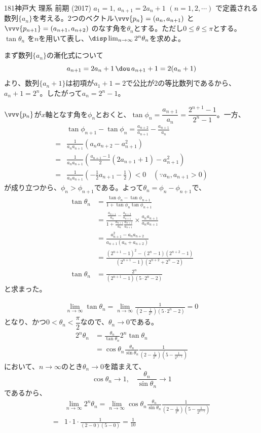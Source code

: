 \begin{prob}{181}{}{神戸大 理系 前期 (2017)}
 $a_1=1$, $a_{n+1}=2a_n+1$ $(n=1, 2, \cdots)$ で定義される数列$\{a_n\}$を考える。2つのベクトル$\vvv{p_n}=(a_n, a_{n+1})$ と$\vvv{p_{n+1}}=(a_{n+1},a_{n+2})$ のなす角を$\theta_n$とする。ただし$0\le\theta\le\pi$とする。$\tan\theta_n$ を$n$を用いて表し、$\disp \lim_{n\to\infty}2^n\theta_n$を求めよ。
\end{prob}
まず数列$\{a_n\}$の漸化式について
\[ a_{n+1}=2a_n+1 \,\dou\, a_{n+1}+1=2(a_n+1) \]
より、数列$\{a_n+1\}$は初項が$a_1+1=2$で公比が2の等比数列であるから、$a_n+1=2^n$。したがって$a_n=2^n-1$。

$\vvv{p_n}$が$x$軸となす角を$\phi_n$とおくと、$\tan\phi_n=\dfrac{a_{n+1}}{a_n}=\dfrac{2^{n+1}-1}{2^n-1}$。一方、
\begin{align*}
 &\tan\phi_{n+1}-\tan\phi_n=\frac{a_{n+2}}{a_{n+1}}-\frac{a_{n+1}}{a_n} \\
 =&\frac{1}{a_na_{n+1}}(a_na_{n+2}-a_{n+1}^2) \\
 =&\frac{1}{a_na_{n+1}}\left(\frac{a_{n+1}-1}{2}(2a_{n+1}+1)-a_{n+1}^2\right) \\
 =&\frac{1}{a_na_{n+1}}\left(-\frac{1}{2}a_{n+1}-\frac{1}{2}\right) < 0 \quad (\because a_n, a_{n+1}>0)
\end{align*}
が成り立つから、$\phi_n>\phi_{n+1}$である。よって$\theta_n=\phi_n-\phi_{n+1}$で、
\begin{align*}
 \tan\theta_n&=\frac{\tan\phi_n-\tan\phi_{n+1}}{1+\tan\phi_n\tan\phi_{n+1}} \\
 &=\frac{\frac{a_{n+1}}{a_n}-\frac{a_{n+2}}{a_{n+1}}}{1+\frac{a_{n+1}}{a_n}\frac{a_{n+2}}{a_{n+1}}}\times\frac{a_na_{n+1}}{a_na_{n+1}} \\
 &=\frac{a_{n+1}^2-a_na_{n+2}}{a_{n+1}(a_n+a_{n+2})} \\
 &=\frac{(2^{n+1}-1)^2-(2^n-1)(2^{n+2}-1)}{(2^{n+1}-1)(2^{n+2}+2^n-2)} \\
 \tan\theta_n&=\frac{2^n}{(2^{n+1}-1)(5\cdot 2^n-2)}
\end{align*}
と求まった。

\begin{align*}
 \lim_{n\to\infty} \tan\theta_n=\lim_{n\to\infty} \frac{1}{\left(2-\frac{1}{2^n}\right)(5\cdot2^n-2)}=0
\end{align*}
となり、かつ$0<\theta_n<\dfrac{\pi}{2}$なので、$\theta_n\to 0$である。
\begin{align*}
 2^n\theta_n&=\frac{\theta_n}{\tan\theta_n}2^n\tan\theta_n \\
 &=\cos\theta_n\frac{\theta_n}{\sin\theta_n}\frac{1}{\left(2-\frac{1}{2^n}\right)\left(5-\frac{1}{2^{n-1}}\right)}
\end{align*}
において、$n\to\infty$のとき$\theta_n\to 0$を踏まえて、
\[ \cos\theta_n\to 1,\quad \frac{\theta_n}{\sin\theta_n}\to 1 \]
であるから、
\begin{align*}
 &\lim_{n\to\infty} 2^n\theta_n = \lim_{n\to\infty} \cos\theta_n\frac{\theta_n}{\sin\theta_n}\frac{1}{\left(2-\frac{1}{2^n}\right)\left(5-\frac{1}{2^{n-1}}\right)} \\
 =& 1\cdot 1\cdot \frac{1}{(2-0) (5-0)}=\frac{1}{10}
\end{align*}
